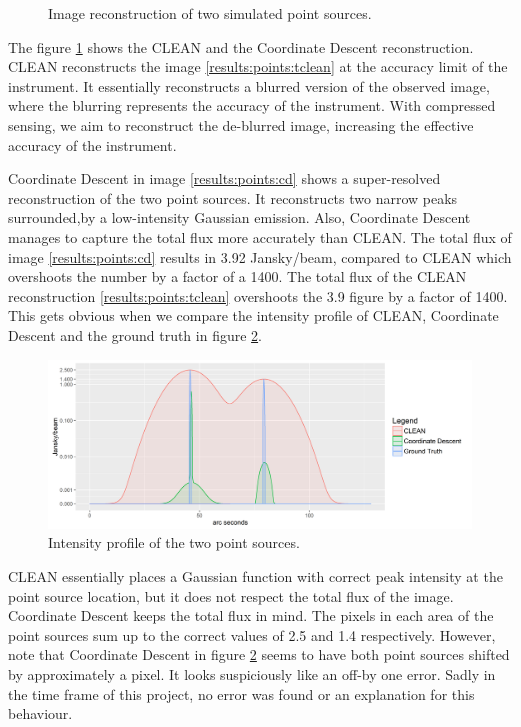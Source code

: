 \begin{figure}[h]
	\caption{Image reconstruction of two simulated point sources.}
	\label{results:points}
\end{figure}

The figure \ref{results:points} shows the CLEAN and the Coordinate Descent reconstruction. CLEAN reconstructs the image \ref{results:points:tclean} at the accuracy limit of the instrument. It essentially reconstructs a blurred version of the observed image, where the blurring represents the accuracy of the instrument. With compressed sensing, we aim to reconstruct the de-blurred image, increasing the effective accuracy of the instrument. 

Coordinate Descent in image \ref{results:points:cd} shows a super-resolved reconstruction of the two point sources. It reconstructs two narrow peaks surrounded,by a low-intensity Gaussian emission. Also, Coordinate Descent manages to capture the total flux more accurately than CLEAN.  The total flux of image \ref{results:points:cd} results in 3.92 Jansky/beam, compared to CLEAN which overshoots the number by a factor of a 1400. The total flux of the CLEAN reconstruction \ref{results:points:tclean} overshoots the 3.9 figure by a factor of 1400. This gets obvious when we compare the intensity profile of CLEAN, Coordinate Descent and the ground truth in figure \ref{results:points:contour}.

\begin{figure}[h]
	\centering
	\includegraphics[width=0.8\linewidth]{./chapters/20.results/points/contour_points.png}
	\caption{Intensity profile of the two point sources.}
	\label{results:points:contour}
\end{figure}

CLEAN essentially places a Gaussian function with correct peak intensity at the point source location, but it does not respect the total flux of the image. Coordinate Descent keeps the total flux in mind. The pixels in each area of the point sources sum up to the correct values of 2.5 and 1.4 respectively. However, note that Coordinate Descent in figure \ref{results:points:contour} seems to have both point sources shifted by approximately a pixel. It looks suspiciously like an off-by one error. Sadly in the time frame of this project, no error was found or an explanation for this behaviour.

